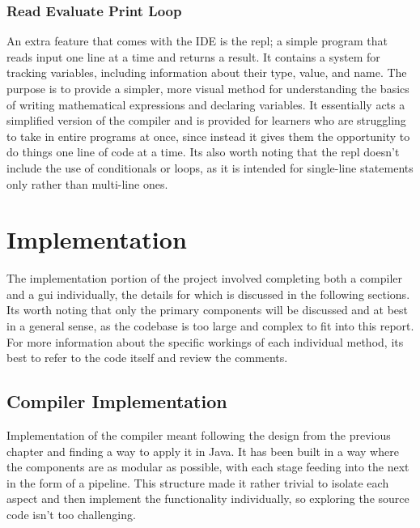 \documentclass[
]{report}
\begin{document}
\subsection{Read Evaluate Print Loop}
An extra feature that comes with the IDE is the \acrshort{repl}; a simple program
that reads input one line at a time and returns a result. It contains a
system for tracking variables, including information about their type,
value, and name. The purpose is to provide a simpler, more visual method
for understanding the basics of writing mathematical \glspl{expression} and
declaring variables. It essentially acts a simplified version of the
compiler and is provided for learners who are struggling to take in
entire programs at once, since instead it gives them the opportunity to
do things one line of code at a time. Its also worth noting that the
\acrshort{repl} doesn't include the use of conditionals or loops, as it is intended
for single-line \glspl{statement} only rather than multi-line ones.

\chapter{Implementation}
The implementation portion of the project involved completing both a
compiler and a \acrshort{gui} individually, the details for which is discussed in
the following sections. Its worth noting that only the primary
components will be discussed and at best in a general sense, as the
codebase is too large and complex to fit into this report. For more
information about the specific workings of each individual method, its
best to refer to the code itself and review the comments.

\section{Compiler Implementation}
Implementation of the compiler meant following the design from the
previous chapter and finding a way to apply it in Java. It has been
built in a way where the components are as modular as possible, with
each stage feeding into the next in the form of a pipeline. This
structure made it rather trivial to isolate each aspect and then
implement the functionality individually, so exploring the source code
isn't too challenging.
\end{document}
